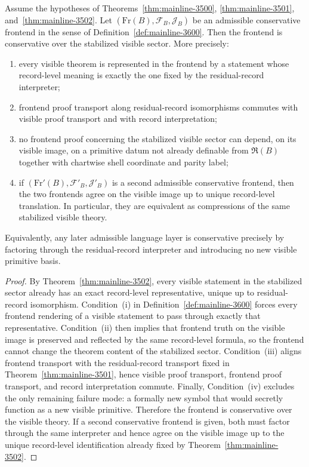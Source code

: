 \begin{theorem}
\label{thm:mainline-3600}
Assume the hypotheses of Theorems~\ref{thm:mainline-3500}, \ref{thm:mainline-3501}, and~\ref{thm:mainline-3502}. Let $(\mathrm{Fr}(B),\mathcal F_B,\mathcal J_B)$ be an admissible conservative frontend in the sense of Definition~\ref{def:mainline-3600}. Then the frontend is conservative over the stabilized visible sector. More precisely:
\begin{enumerate}[label=(\roman*), leftmargin=2em]
  \item every visible theorem is represented in the frontend by a statement whose record-level meaning is exactly the one fixed by the residual-record interpreter;
  \item frontend proof transport along residual-record isomorphisms commutes with visible proof transport and with record interpretation;
  \item no frontend proof concerning the stabilized visible sector can depend, on its visible image, on a primitive datum not already definable from $\mathfrak R(B)$ together with chartwise shell coordinate and parity label;
  \item if $(\mathrm{Fr}'(B),\mathcal F'_B,\mathcal J'_B)$ is a second admissible conservative frontend, then the two frontends agree on the visible image up to unique record-level translation. In particular, they are equivalent as compressions of the same stabilized visible theory.
\end{enumerate}
Equivalently, any later admissible language layer is conservative precisely by factoring through the residual-record interpreter and introducing no new visible primitive basis.
\end{theorem}

\begin{proof}
By Theorem~\ref{thm:mainline-3502}, every visible statement in the stabilized sector already has an exact record-level representative, unique up to residual-record isomorphism. Condition~(i) in Definition~\ref{def:mainline-3600} forces every frontend rendering of a visible statement to pass through exactly that representative. Condition~(ii) then implies that frontend truth on the visible image is preserved and reflected by the same record-level formula, so the frontend cannot change the theorem content of the stabilized sector. Condition~(iii) aligns frontend transport with the residual-record transport fixed in Theorem~\ref{thm:mainline-3501}, hence visible proof transport, frontend proof transport, and record interpretation commute. Finally, Condition~(iv) excludes the only remaining failure mode: a formally new symbol that would secretly function as a new visible primitive. Therefore the frontend is conservative over the visible theory. If a second conservative frontend is given, both must factor through the same interpreter and hence agree on the visible image up to the unique record-level identification already fixed by Theorem~\ref{thm:mainline-3502}.
\end{proof}

